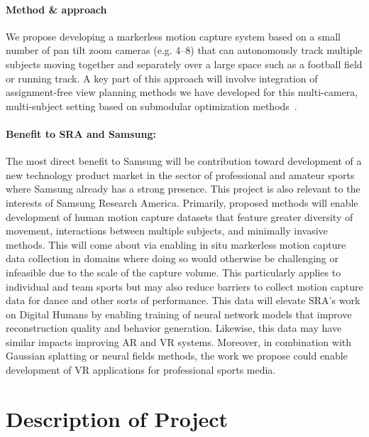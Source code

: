 \documentclass[12pt]{article}
\begin{document}
\paragraph{Method \& approach}

We propose developing a markerless motion capture system based on a small number
of pan tilt zoom cameras (e.g. 4--8) that can autonomously track multiple
subjects moving together and separately over a large space such as a football
field or running track.
A key part of this approach will involve integration of assignment-free view
planning methods we have developed for this multi-camera, multi-subject setting
based on submodular optimization methods~\citep{suresh2024iros,hughes2024cdc}.

\paragraph{Benefit to SRA and Samsung:}

The most direct benefit to Samsung will be contribution toward development of a
new technology product market in the sector of professional and amateur sports
where Samsung already has a strong presence.
This project is also relevant to the interests of Samsung Research America.
Primarily, proposed methods will enable development of human motion capture
datasets that feature greater diversity of movement, interactions between
multiple subjects, and minimally invasive methods.
This will come about via enabling in situ markerless motion capture data
collection in domains where doing so would otherwise be challenging or
infeasible due to the scale of the capture volume.
This particularly applies to individual and team sports but may also reduce
barriers to collect motion capture data for dance and other sorts of
performance.
This data will elevate SRA's work on Digital Humans by enabling training of
neural network models that improve reconstruction quality and behavior
generation.
Likewise, this data may have similar impacts improving AR and VR systems.
Moreover, in combination with Gaussian splatting or neural fields methods, the
work we propose could enable development of VR applications for professional
sports media.

\section{Description of Project}
\end{document}
